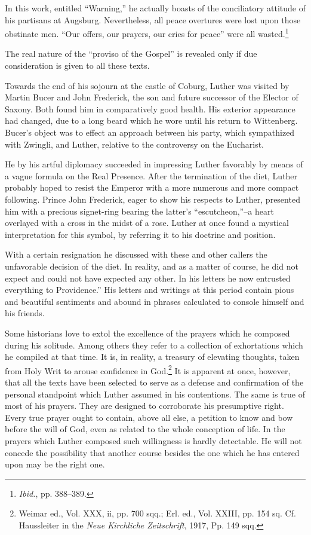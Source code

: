 In this work, entitled “Warning,”
he actually boasts of the conciliatory attitude of his partisans at Augsburg.
Nevertheless, all peace overtures were lost upon those obstinate
men. “Our offers, our prayers, our cries for peace” were all wasted.\footnote{\textit{Ibid.}, pp. 388--389.}

The real nature of the “proviso of the Gospel” is revealed only if
due consideration is given to all these texts.

Towards the end of his sojourn at the castle of Coburg, Luther was
visited by Martin Bucer and John Frederick, the son and future
successor of the Elector of Saxony. Both found him in comparatively
good health. His exterior appearance had changed, due to a long
beard which he wore until his return to Wittenberg. Bucer’s object
was to effect an approach between his party, which sympathized with
Zwingli, and Luther, relative to the controversy on the Eucharist.

He by his artful diplomacy succeeded in impressing Luther
favorably by means of a vague formula on the Real Presence. After
the termination of the diet, Luther probably hoped to resist the Emperor
with a more numerous and more compact following. Prince
John Frederick, eager to show his respects to Luther, presented him
with a precious signet-ring bearing the latter’s “escutcheon,”--a
heart overlayed with a cross in the midst of a rose. Luther at once
found a mystical interpretation for this symbol, by referring it to
his doctrine and position.

With a certain resignation he discussed with these and other callers
the unfavorable decision of the diet. In reality, and as a matter of
course, he did not expect and could not have expected any other.
In his letters he now entrusted everything to Providence.”
His letters and writings at this period contain pious and beautiful sentiments
and abound in phrases calculated to console himself and his friends.

Some historians love to extol the excellence of the prayers which he
composed during his solitude. Among others they refer to a collection
of exhortations which he compiled at that time. It is, in reality, a
treasury of elevating thoughts, taken from Holy Writ to arouse confidence
in God.\footnote
{Weimar ed., Vol. XXX, ii, pp. 700 sqq.; Erl. ed., Vol. XXIII, pp. 154 sq. Cf. Haussleiter
in the \textit{Neue Kirchliche Zeitschrift}, 1917, Pp. 149 sqq.}
It is apparent at once, however, that all the texts
have been selected to serve as a defense and confirmation of the personal
standpoint which Luther assumed in his contentions. The same
is true of most of his prayers. They are designed to corroborate his
presumptive right. Every true prayer ought to contain, above all
else, a petition to know and bow before the will of God, even as related
to the whole conception of life. In the prayers which Luther
composed such willingness is hardly detectable. He will not concede
the possibility that another course besides the one which he has entered
upon may be the right one.

